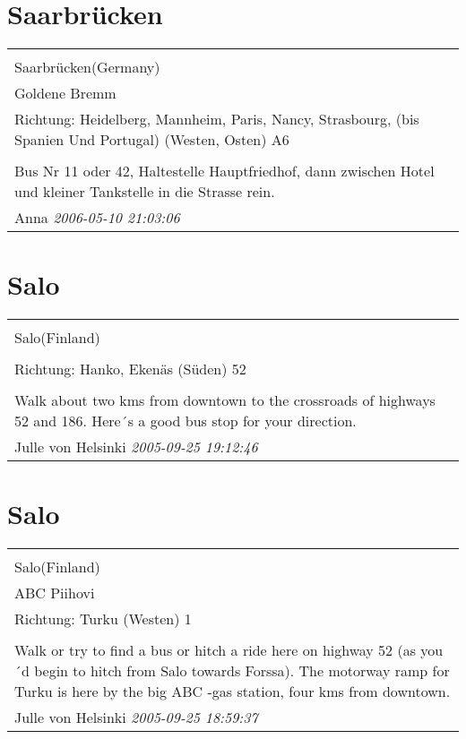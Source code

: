 \documentclass[a4paper,12pt]{article}
\begin{document}
\section{Saarbrücken}
\begin{tabular}{|p{13cm}|}
\hline\\
Saarbrücken(Germany)\\
Goldene Bremm\\
Richtung: Heidelberg, Mannheim, Paris, Nancy, Strasbourg, (bis Spanien Und Portugal) (Westen, Osten) A6 \\
\hline\\
Bus Nr 11 oder 42, Haltestelle Hauptfriedhof, dann zwischen Hotel und kleiner Tankstelle in die Strasse rein. \\
Anna \textit{ 2006-05-10 21:03:06 }\\\hline
\end{tabular}


\section{Salo}
\begin{tabular}{|p{13cm}|}
\hline\\
Salo(Finland)\\
\\
Richtung: Hanko, Ekenäs (Süden) 52 \\
\hline\\
Walk about two kms from downtown to the crossroads of highways 52 and 186. Here´s a good bus stop for your direction. \\
Julle von Helsinki \textit{ 2005-09-25 19:12:46 }\\\hline
\end{tabular}


\section{Salo}
\begin{tabular}{|p{13cm}|}
\hline\\
Salo(Finland)\\
ABC Piihovi\\
Richtung: Turku (Westen) 1 \\
\hline\\
Walk or try to find a bus or hitch a ride here on highway 52 (as you´d begin to hitch from Salo towards Forssa). The motorway ramp for Turku is here by the big ABC -gas station, four kms from downtown. \\
Julle von Helsinki \textit{ 2005-09-25 18:59:37 }\\\hline
\end{tabular}
\end{document}
